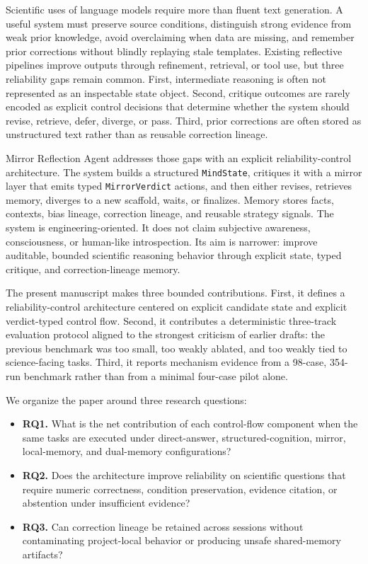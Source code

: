 \documentclass[12pt]{article}
\begin{document}
Scientific uses of language models require more than fluent text generation. A useful system must preserve source conditions, distinguish strong evidence from weak prior knowledge, avoid overclaiming when data are missing, and remember prior corrections without blindly replaying stale templates. Existing reflective pipelines improve outputs through refinement, retrieval, or tool use, but three reliability gaps remain common. First, intermediate reasoning is often not represented as an inspectable state object. Second, critique outcomes are rarely encoded as explicit control decisions that determine whether the system should revise, retrieve, defer, diverge, or pass. Third, prior corrections are often stored as unstructured text rather than as reusable correction lineage.

Mirror Reflection Agent addresses those gaps with an explicit reliability-control architecture. The system builds a structured \texttt{MindState}, critiques it with a mirror layer that emits typed \texttt{MirrorVerdict} actions, and then either revises, retrieves memory, diverges to a new scaffold, waits, or finalizes. Memory stores facts, contexts, bias lineage, correction lineage, and reusable strategy signals. The system is engineering-oriented. It does not claim subjective awareness, consciousness, or human-like introspection. Its aim is narrower: improve auditable, bounded scientific reasoning behavior through explicit state, typed critique, and correction-lineage memory.

The present manuscript makes three bounded contributions. First, it defines a reliability-control architecture centered on explicit candidate state and explicit verdict-typed control flow. Second, it contributes a deterministic three-track evaluation protocol aligned to the strongest criticism of earlier drafts: the previous benchmark was too small, too weakly ablated, and too weakly tied to science-facing tasks. Third, it reports mechanism evidence from a 98-case, 354-run benchmark rather than from a minimal four-case pilot alone.

We organize the paper around three research questions:
\begin{itemize}
\item \textbf{RQ1.} What is the net contribution of each control-flow component when the same tasks are executed under direct-answer, structured-cognition, mirror, local-memory, and dual-memory configurations?
\item \textbf{RQ2.} Does the architecture improve reliability on scientific questions that require numeric correctness, condition preservation, evidence citation, or abstention under insufficient evidence?
\item \textbf{RQ3.} Can correction lineage be retained across sessions without contaminating project-local behavior or producing unsafe shared-memory artifacts?
\end{itemize}
\end{document}
